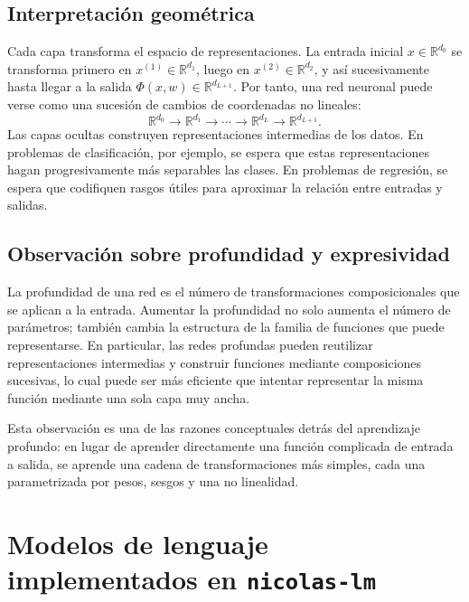 \documentclass[11pt]{report}
\theoremstyle{definition}
\theoremstyle{plain}
\numberwithin{equation}{section}
\begin{document}
\section{Interpretación geométrica}

Cada capa transforma el espacio de representaciones. La entrada inicial \(x\in\mathbb{R}^{d_0}\) se transforma primero en \(x^{(1)}\in\mathbb{R}^{d_1}\), luego en \(x^{(2)}\in\mathbb{R}^{d_2}\), y así sucesivamente hasta llegar a la salida \(\Phi(x,w)\in\mathbb{R}^{d_{L+1}}\). Por tanto, una red neuronal puede verse como una sucesión de cambios de coordenadas no lineales:
\begin{equation*}
    \mathbb{R}^{d_0}
    \longrightarrow
    \mathbb{R}^{d_1}
    \longrightarrow
    \cdots
    \longrightarrow
    \mathbb{R}^{d_L}
    \longrightarrow
    \mathbb{R}^{d_{L+1}}.
\end{equation*}
Las capas ocultas construyen representaciones intermedias de los datos. En problemas de clasificación, por ejemplo, se espera que estas representaciones hagan progresivamente más separables las clases. En problemas de regresión, se espera que codifiquen rasgos útiles para aproximar la relación entre entradas y salidas.

\section{Observación sobre profundidad y expresividad}

La profundidad de una red es el número de transformaciones composicionales que se aplican a la entrada. Aumentar la profundidad no solo aumenta el número de parámetros; también cambia la estructura de la familia de funciones que puede representarse. En particular, las redes profundas pueden reutilizar representaciones intermedias y construir funciones mediante composiciones sucesivas, lo cual puede ser más eficiente que intentar representar la misma función mediante una sola capa muy ancha.

Esta observación es una de las razones conceptuales detrás del aprendizaje profundo: en lugar de aprender directamente una función complicada de entrada a salida, se aprende una cadena de transformaciones más simples, cada una parametrizada por pesos, sesgos y una no linealidad.




\chapter{Modelos de lenguaje implementados en \texttt{nicolas-lm}}
\end{document}
